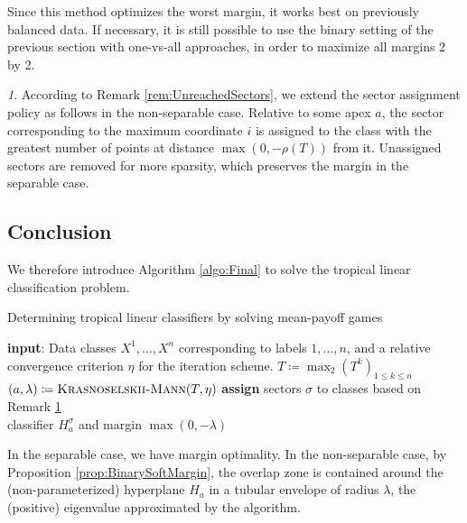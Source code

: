 \documentclass[oneside,UKenglish,a4paper]{amsart}
\numberwithin{equation}{section}
\numberwithin{figure}{section}
\theoremstyle{plain}
\theoremstyle{definition}
\theoremstyle{plain}
\theoremstyle{remark}
\newtheorem{rem}[thm]{\protect\remarkname}
\theoremstyle{plain}
\theoremstyle{definition}
\theoremstyle{definition}
\providecommand{\remarkname}{Remark}
\newcommand{\Input}{\textbf{input}}
\begin{document}

Since this method optimizes the worst margin, it works best on previously balanced data. If necessary, it is still possible to use the binary setting of the previous section with one-vs-all approaches, in order to maximize all margins 2 by 2.


\begin{rem}\label{rem:SectorAssign}
According to Remark \ref{rem:UnreachedSectors}, we extend the sector assignment policy as follows in the non-separable case. Relative to some apex $a$, the sector corresponding to the maximum coordinate $i$ is assigned to the class with the greatest number of points at distance $\max(0,-\rho(T))$ from it. Unassigned sectors are removed for more sparsity, which preserves the margin in the separable case.
\end{rem}


\subsection*{Conclusion}

We therefore introduce Algorithm \ref{algo:Final} to solve the tropical linear classification problem.

\begin{algorithm}[h!]
\caption{Determining tropical linear classifiers by solving mean-payoff games}
\label{algo:Final}
\begin{algorithmic}[1]
  \State \Input: Data classes $X^1,\ldots, X^n$ corresponding to labels $1, \ldots, n$, and a relative convergence criterion $\eta$ for the iteration scheme.
\State $T\coloneqq\max_2 \left(T^k\right)_{1\le k \le n}$
\State $(a,\lambda) \coloneqq \textsc{Krasnoselskii-Mann}(T, \eta)$ \label{step:3}
\State \textbf{assign} sectors $\sigma$ to classes based on Remark \ref{rem:SectorAssign}\\
\Return classifier $H_a^\sigma$ and margin $\max(0, -\lambda)$
\end{algorithmic}
\end{algorithm}

In the separable case, we have margin optimality. In the non-separable case, by Proposition \ref{prop:BinarySoftMargin}, the overlap zone is contained around the (non-parameterized) hyperplane $H_a$ in a tubular envelope of radius $\lambda$, the (positive) eigenvalue approximated by the algorithm.
\end{document}
